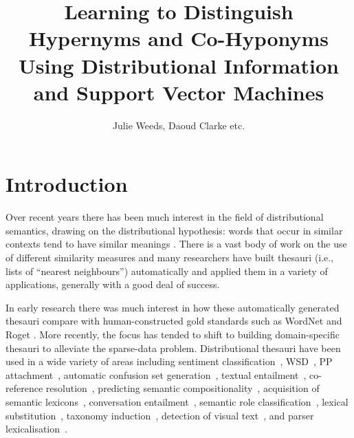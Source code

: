 \documentclass[11pt]{article}
\title{Learning to Distinguish Hypernyms and Co-Hyponyms Using Distributional Information and Support Vector Machines}
\author{Julie Weeds, Daoud Clarke etc.}
\date{} %
\begin{document}
\maketitle

\begin{abstract}
\end{abstract}
\section{Introduction}

Over recent years there has been much interest in the field of distributional semantics, drawing on the distributional hypothesis: words that occur in similar contexts tend to have similar meanings \cite{Harris1954}.   There is a vast body of work on the use of different similarity measures \cite{Lee1999,Weeds2003,Curran2004} and many researchers have built thesauri (i.e., lists of ``nearest neighbours'') automatically and applied them in a variety of applications, generally with a good deal of success.

In early research there was much interest in how these automatically generated thesauri compare with human-constructed gold standards such as WordNet and Roget \cite{Lin1998,Kilgarriff2000}.  More recently, the focus has tended to shift to building domain-specific thesauri to alleviate the sparse-data problem.  Distributional thesauri have been used in a wide variety of areas including sentiment classification~\cite{Bollegala2011}, WSD~\cite{miller-EtAl:2012:PAPERS,khapra-EtAl:2010:ACL}, PP attachment~\cite{Calvo05distributionalthesaurus}, automatic confusion set generation~\cite{xue-hwa:2012:PAPERS}, textual entailment~\cite{berant-dagan-goldberger:2010:ACL}, co-reference resolution~\cite{lee-EtAl:2012:EMNLP-CoNLL}, predicting semantic compositionality~\cite{bergsma-EtAl:2010:EMNLP}, acquisition of semantic lexicons~\cite{mcintosh:2010:EMNLP}, conversation entailment~\cite{zhang-chai:2010:EMNLP}, semantic role classification~\cite{zapirain-EtAl:2010:NAACLHLT}, lexical substitution~\cite{szarvas-biemann-gurevych:2013:NAACL-HLT}, taxonomy induction~\cite{fountain-lapata:2012:NAACL-HLT}, detection of visual text~\cite{dodge-EtAl:2012:NAACL-HLT}, and parser lexicalisation~\cite{rei-briscoe:2013:NAACL-HLT}.  
\end{document}
